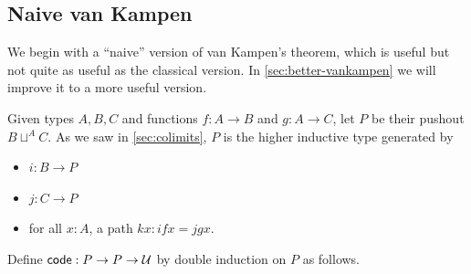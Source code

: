\subsection{Naive van Kampen}
\label{sec:naive-vankampen}

We begin with a ``naive'' version of van Kampen's theorem, which is useful but not quite as useful as the classical version.
In \autoref{sec:better-vankampen} we will improve it to a more useful version.

Given types $A,B,C$ and functions $f:A\to B$ and $g:A\to C$, let $P$ be their pushout $B\sqcup^A C$.
As we saw in \autoref{sec:colimits}, $P$ is the higher inductive type generated by
\begin{itemize}
\item $i:B\to P$
\item $j:C\to P$
\item for all $x:A$, a path $k x:ifx = jgx$.
\end{itemize}
Define $\mathsf{code}:P\to P\to \mathcal{U}$ by double induction on $P$ as follows.
